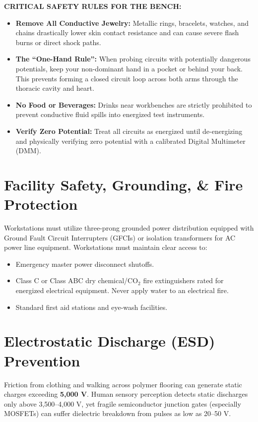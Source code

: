 \begin{safetybox}
\textbf{CRITICAL SAFETY RULES FOR THE BENCH:}
\begin{itemize}[leftmargin=1.2em]
    \item \textbf{Remove All Conductive Jewelry:} Metallic rings, bracelets, watches, and chains drastically lower skin contact resistance and can cause severe flash burns or direct shock paths.
    \item \textbf{The ``One-Hand Rule'':} When probing circuits with potentially dangerous potentials, keep your non-dominant hand in a pocket or behind your back. This prevents forming a closed circuit loop across both arms through the thoracic cavity and heart.
    \item \textbf{No Food or Beverages:} Drinks near workbenches are strictly prohibited to prevent conductive fluid spills into energized test instruments.
    \item \textbf{Verify Zero Potential:} Treat all circuits as energized until de-energizing and physically verifying zero potential with a calibrated Digital Multimeter (DMM).
\end{itemize}
\end{safetybox}

\section{Facility Safety, Grounding, \& Fire Protection}
Workstations must utilize three-prong grounded power distribution equipped with Ground Fault Circuit Interrupters (GFCIs) or isolation transformers for AC power line equipment. Workstations must maintain clear access to:
\begin{itemize}[leftmargin=1.5em]
    \item Emergency master power disconnect shutoffs.
    \item Class C or Class ABC dry chemical/CO$_2$ fire extinguishers rated for energized electrical equipment. Never apply water to an electrical fire.
    \item Standard first aid stations and eye-wash facilities.
\end{itemize}

\section{Electrostatic Discharge (ESD) Prevention}
Friction from clothing and walking across polymer flooring can generate static charges exceeding \textbf{5,000 V}. Human sensory perception detects static discharges only above 3,500--4,000 V, yet fragile semiconductor junction gates (especially MOSFETs) can suffer dielectric breakdown from pulses as low as 20--50 V.


